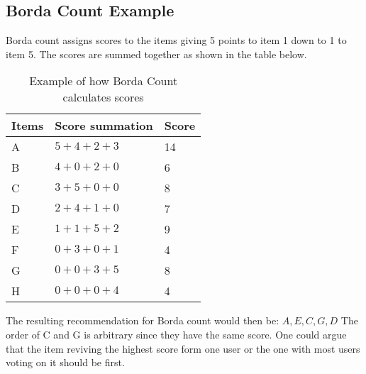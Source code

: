 \subsection*{Borda Count Example}
Borda count assigns scores to the items giving 5 points to item 1 down to 1 to item 5.
The scores are summed together as shown in the table below.

\begin{table}[h]
\begin{tabular}{|l|l|l|}\hline
Items & Score summation & Score \\\hline
A     & $5 + 4 + 2 +3$  & 14    \\
B     & $4 + 0 + 2 +0$  & 6     \\
C     & $3+5+0+0$       & 8     \\
D     & $2+4+1+0$       & 7     \\
E     & $1+1+5+2$       & 9     \\
F     & $0 + 3+0+1$     & 4     \\
G     & $0+0+3+5$       & 8     \\
H     & $0+0+0+4$       & 4    \\\hline
\end{tabular}
\caption{Example of how Borda Count calculates scores}
\end{table}

The resulting recommendation for Borda count would then be: $A,E,C,G,D$
The order of C and G is arbitrary since they have the same score. One could argue that the item reviving the highest score form one user or the one with most users voting on it should be first.